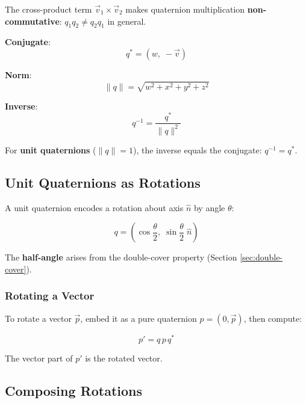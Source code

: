\documentclass[12pt,a4paper]{article}
\begin{document}
The cross-product term $\vec{v}_1\times\vec{v}_2$ makes quaternion
multiplication \textbf{non-commutative}: $q_1 q_2 \neq q_2 q_1$ in general.

\textbf{Conjugate}:
\begin{equation}
  q^{*} = (w,\;-\vec{v})
\end{equation}

\textbf{Norm}:
\begin{equation}
  \|q\| = \sqrt{w^2 + x^2 + y^2 + z^2}
\end{equation}

\textbf{Inverse}:
\begin{equation}
  q^{-1} = \frac{q^{*}}{\|q\|^2}
\end{equation}

For \textbf{unit quaternions} ($\|q\|=1$), the inverse equals the conjugate:
$q^{-1} = q^{*}$.

\subsection{Unit Quaternions as Rotations}

A unit quaternion encodes a rotation about axis $\hat{n}$ by angle $\theta$:

\begin{equation}
  q = \left(\cos\frac{\theta}{2},\;
      \sin\frac{\theta}{2}\;\hat{n}\right)
\end{equation}

The \textbf{half-angle} arises from the double-cover property (Section
\ref{sec:double-cover}).

\subsubsection*{Rotating a Vector}

To rotate a vector $\vec{p}$, embed it as a pure quaternion
$p=(0,\vec{p})$, then compute:

\begin{equation}
  p' = q\,p\,q^{*}
\end{equation}

The vector part of $p'$ is the rotated vector.

\subsection{Composing Rotations}
\end{document}
